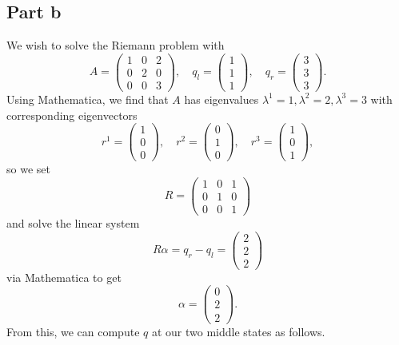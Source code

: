 \documentclass{article}
\begin{document}
\subsection{Part b}
We wish to solve the Riemann problem with 
\[
A=\begin{pmatrix}
	1&0&2\\0&2&0\\0&0&3
\end{pmatrix},\quad q_l=\begin{pmatrix}
	1\\1\\1
\end{pmatrix},\quad q_r=\begin{pmatrix}
	3\\3\\3
\end{pmatrix}.
\]
Using Mathematica, we find that $A$ has eigenvalues $\lambda^1=1,\lambda^2=2,\lambda^3=3$ with corresponding eigenvectors
\[
r^1=\begin{pmatrix}
	1\\0\\0
\end{pmatrix},\quad r^2=\begin{pmatrix}
	0\\1\\0
\end{pmatrix},\quad r^3=\begin{pmatrix}
	1\\0\\1
\end{pmatrix},
\]
so we set
\[
R=\begin{pmatrix}
	1&0&1\\
	0&1&0\\
	0&0&1
\end{pmatrix}
\]
and solve the linear system 
\[
R\alpha=q_r-q_l=\begin{pmatrix}
	2\\2\\2
\end{pmatrix}
\]
via Mathematica to get
\[
\alpha=\begin{pmatrix}
	0\\2\\2
\end{pmatrix}.
\]
From this, we can compute $q$ at our two middle states as follows.
\end{document}
